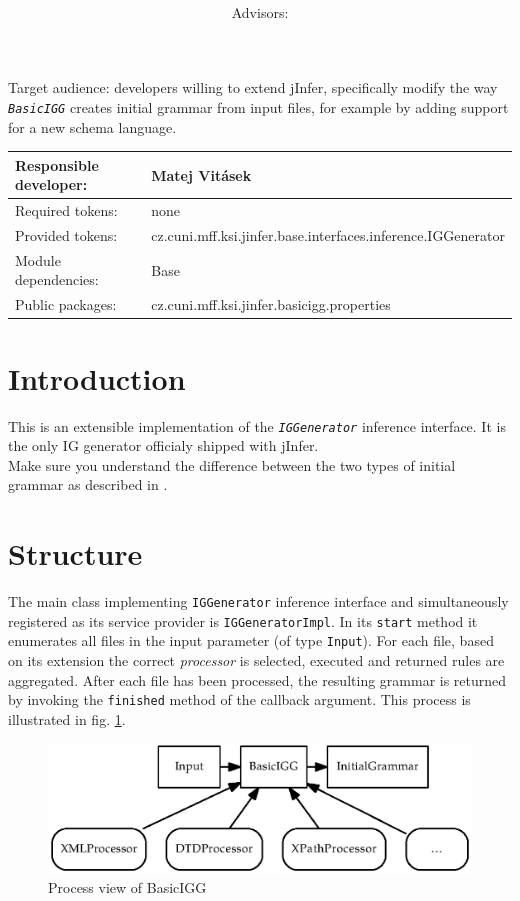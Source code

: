 \documentclass[a4paper,10pt,oneside]{article}
\title{\bf\mftitle}
\author{\mfauthor \\ Advisors: \mfadvisor}
\date{\mfplacedate}
\newcommand{\myscale}{0.74}
\newcommand{\code}[1]{\texttt{#1}}
\newcommand{\jmodule}[1]{\texttt{\textit{#1}}}
\begin{document}
\maketitle
\noindent Target audience: developers willing to extend jInfer, specifically modify the way \jmodule{BasicIGG} creates initial grammar from input files, for example by adding support for a new schema language.

\noindent \begin{tabular}{|l|l|} \hline
Responsible developer: & Matej Vitásek \\ \hline
Required tokens:       & none \\ \hline
Provided tokens:       & cz.cuni.mff.ksi.jinfer.base.interfaces.inference.IGGenerator \\ \hline
Module dependencies:   & Base \\ \hline
Public packages:       & cz.cuni.mff.ksi.jinfer.basicigg.properties \\ \hline
\end{tabular}

\section{Introduction}

This is an extensible implementation of the \jmodule{IGGenerator} inference interface. It is the only IG generator officialy shipped with jInfer.\\
Make sure you understand the difference between the two types of initial grammar as described in \cite{archdoc}.

\section{Structure}

The main class implementing \code{IGGenerator} inference interface and simultaneously registered as its service provider is \code{IGGeneratorImpl}. In its \code{start} method it enumerates all files in the input parameter (of type \code{Input}). For each file, based on its extension the correct \emph{processor} is selected, executed and returned rules are aggregated. After each file has been processed, the resulting grammar is returned by invoking the \code{finished} method of the callback argument. This process is illustrated in fig. \ref{figure-process}.

\begin{figure}
	\centering\includegraphics[scale=\myscale]{process-view}
	\caption{Process view of BasicIGG} \label{figure-process}
\end{figure}
\end{document}
